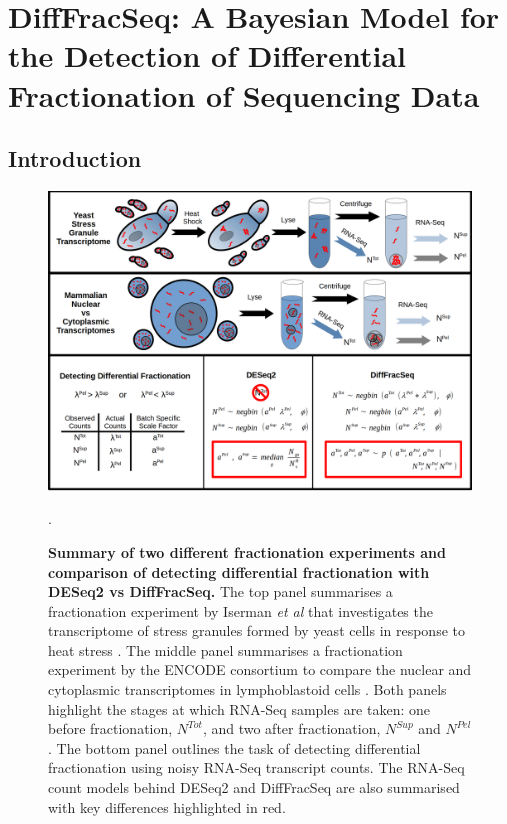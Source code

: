 \documentclass[../main.tex]{subfiles}
\begin{document}
\chapter{{DiffFracSeq: A Bayesian Model for the Detection of Differential Fractionation of Sequencing Data}}

\section{Introduction}

\begin{figure}

{\centering \includegraphics[width=1\linewidth]{figures/diffFracSeq_diagram.png} 

}

\caption[DiffFracSeq chapter summary.]{\textbf{Summary of two different fractionation experiments and comparison of detecting differential fractionation with DESeq2 vs DiffFracSeq.} The top panel summarises a fractionation experiment by Iserman \textit{et al} that investigates the transcriptome of stress granules formed by yeast cells in response to heat stress \parencite{Iserman2020}. The middle panel summarises a fractionation experiment by the ENCODE consortium to compare the nuclear and cytoplasmic transcriptomes in lymphoblastoid cells \parencite{Dunham2012}. Both panels highlight the stages at which RNA-Seq samples are taken: one before fractionation, $N^{Tot}$, and two after fractionation, $N^{Sup}$ and $N^{Pel}$. The bottom panel outlines the task of detecting differential fractionation using noisy RNA-Seq transcript counts. The RNA-Seq count models behind DESeq2 and DiffFracSeq are also summarised with key differences highlighted in red.}. \label{fig:diffFracSeq-diagram}
\end{figure}
\end{document}
